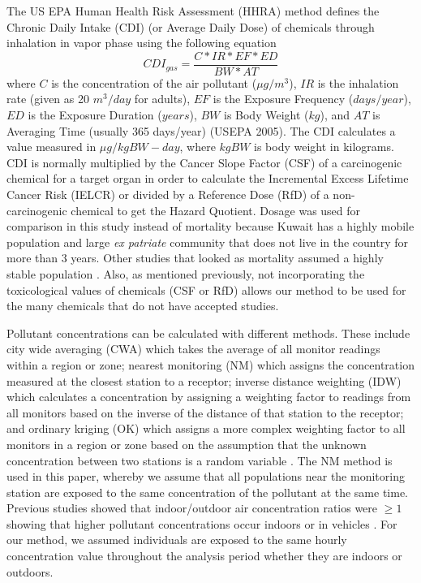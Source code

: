 The US EPA Human Health Risk Assessment (HHRA) method defines the Chronic Daily Intake (CDI) (or Average Daily Dose) of chemicals through inhalation in vapor phase using the following equation
%
\begin{equation}
\label{eq1:cdi_gas}
CDI_{gas} = \frac{C*IR*EF*ED}{BW*AT}
\end{equation}
%
\noindent
where $C$ is the concentration of the air pollutant ($\mu g/m^{3}$), $IR$ is the inhalation rate (given as 20 $m^{3}/day$ for adults), $EF$ is the Exposure Frequency ($days/year$), $ED$ is the Exposure Duration ($years$), $BW$ is Body Weight ($kg$), and $AT$ is Averaging Time (usually 365 days/year) (USEPA 2005).  The CDI calculates a value measured in $\mu g/kgBW-day$, where $kgBW$ is body weight in kilograms. CDI is normally multiplied by the Cancer Slope Factor (CSF) of a carcinogenic chemical for a target organ in order to calculate the Incremental Excess Lifetime Cancer Risk (IELCR) or divided by a Reference Dose (RfD) of a non-carcinogenic chemical to get the Hazard Quotient. Dosage was used for comparison in this study instead of mortality because Kuwait has a highly mobile population and large \textit{ex patriate} community that does not live in the country for more than 3 years. 
Other studies that looked as mortality assumed a highly stable population \citep{Sanhueza2010}. Also, as mentioned previously, not incorporating the toxicological values of chemicals (CSF or RfD) allows our method to be used for the many chemicals that do not have accepted studies.

Pollutant concentrations can be calculated with different methods. These include city wide averaging (CWA) which takes the average of all monitor readings within a region or zone; nearest monitoring (NM) which assigns the concentration measured at the closest station to a receptor; inverse distance weighting (IDW) which calculates a concentration by assigning a weighting factor to readings from all monitors based on the inverse of the distance of that station to the receptor; and ordinary kriging (OK) which assigns a more complex weighting factor to all monitors in a region or zone based on the assumption that the unknown concentration between two stations is a random variable \citep{Rivera2015}. The NM method is used in this paper, whereby we assume that all populations near the monitoring station are exposed to the same concentration of the pollutant at the same time. Previous studies showed that indoor/outdoor air concentration ratios were $\geq 1$ showing that higher pollutant concentrations occur indoors \citep{Schembari2013} or in vehicles \citep{Abi-Esber2013}. For our method, we assumed individuals are exposed to the same hourly concentration value throughout the analysis period whether they are indoors or outdoors.

